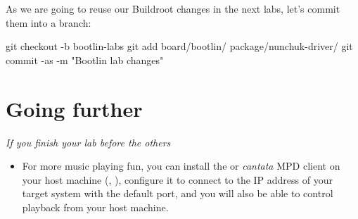 As we are going to reuse our Buildroot changes in the next labs,
let's commit them into a branch:

\begin{bashinput}
git checkout -b bootlin-labs
git add board/bootlin/ package/nunchuk-driver/
git commit -as -m "Bootlin lab changes"
\end{bashinput}

\section{Going further}

{\em If you finish your lab before the others}

\begin{itemize}
\item For more music playing fun, you can install the  or
  {\em cantata} MPD client on your host machine (, ), configure it to
  connect to the IP address of your target system with the default
  port, and you will also be able to control playback from your host
  machine.
\end{itemize}

